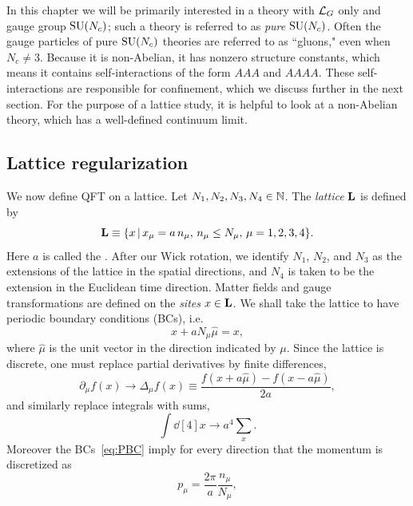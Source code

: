 In this chapter we will be primarily interested in a theory with 
$\mathcal{L}_G$ only and gauge group $\operatorname{SU}(N_c)$; such a theory is referred
to as {\it pure} $\operatorname{SU}(N_c)$.
Often the gauge particles of pure $\operatorname{SU}(N_c)$ theories are referred
to as ``gluons," even when $N_c\neq 3$. Because it
is non-Abelian, it has nonzero structure constants, which means it
contains self-interactions of the form $AAA$ and $AAAA$. 
These self-interactions are responsible for confinement, which we discuss
further in the next section. 
For the purpose of a lattice study,
it is helpful to look at a non-Abelian theory, which
has a well-defined continuum limit.

\subsection{Lattice regularization}\label{sec:latreg}
We now define QFT on a lattice. Let $N_{1},N_{2},N_{3},N_{4}
\in \mathbb{N}$. The {\it lattice} ${\mathbf L}$ is defined by
\begin{equation}
  {\mathbf L}\equiv\{x\,|\,x_\mu=a\,n_\mu,\,n_\mu\le N_\mu,\,
      \mu=1,2,3,4\}.
\end{equation}
Here $a$ is called the . 
After our Wick rotation, we identify $N_1$, $N_2$, and $N_3$
as the extensions of the lattice in the spatial directions,
and $N_4$ is taken to be the extension in the Euclidean time 
direction. Matter fields and gauge 
transformations are defined on the  {\it sites} $x\in\mathbf L$. We shall 
take the lattice to have periodic boundary conditions (BCs), i.e.
\begin{equation}\label{eq:PBC}
  x+aN_{\mu}\hat{\mu}=x,
\end{equation}
where $\hat{\mu}$ is the unit vector in the direction indicated by $\mu$. 
Since the lattice is discrete, one must replace partial derivatives 
by finite differences, 
\begin{equation}\label{eq:dertodiff}
  \partial_\mu f(x)\to\Delta_{\mu}f(x)\equiv\frac{f(x+a\hat{\mu})
                                                   -f(x-a\hat{\mu})}{2a},
\end{equation}
and similarly replace integrals with sums,
\begin{equation}\label{eq:inttosum}
  \int \dd[4]{x}\to a^4\sum_x.
\end{equation}
Moreover the BCs~\eqref{eq:PBC} imply for every direction
that the momentum is discretized as
\begin{equation}
  p_\mu=\frac{2\pi}{a}\frac{n_\mu}{N_\mu},
\end{equation}
